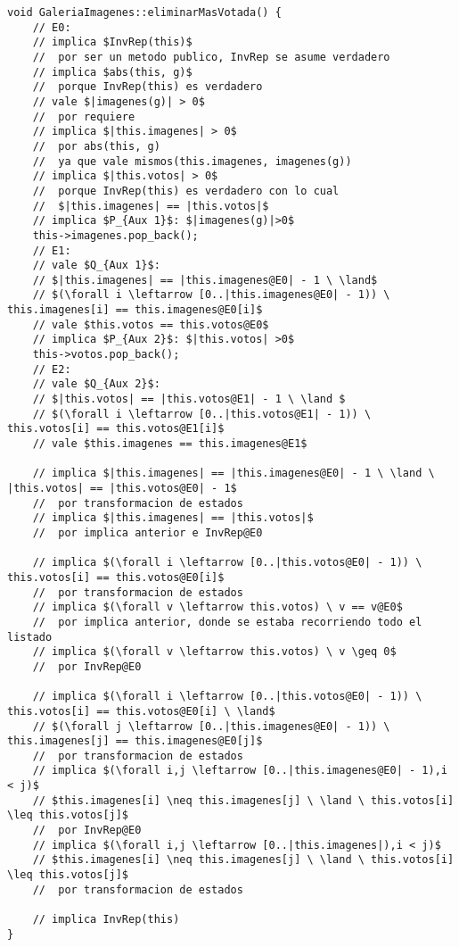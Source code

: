 \documentclass[10pt,a4paper,spanish]{article}
\begin{document}
\begin{lstlisting}
void GaleriaImagenes::eliminarMasVotada() {
	// E0:
	// implica $InvRep(this)$
	// 	por ser un metodo publico, InvRep se asume verdadero
	// implica $abs(this, g)$
	// 	porque InvRep(this) es verdadero
	// vale $|imagenes(g)| > 0$
	// 	por requiere
	// implica $|this.imagenes| > 0$
	// 	por abs(this, g)
	//	ya que vale mismos(this.imagenes, imagenes(g))
	// implica $|this.votos| > 0$
	// 	porque InvRep(this) es verdadero con lo cual
	//	$|this.imagenes| == |this.votos|$
	// implica $P_{Aux 1}$: $|imagenes(g)|>0$
	this->imagenes.pop_back();
	// E1:
	// vale $Q_{Aux 1}$: 
	// $|this.imagenes| == |this.imagenes@E0| - 1 \ \land$
	// $(\forall i \leftarrow [0..|this.imagenes@E0| - 1)) \ this.imagenes[i] == this.imagenes@E0[i]$
	// vale $this.votos == this.votos@E0$
	// implica $P_{Aux 2}$: $|this.votos| >0$
	this->votos.pop_back();
	// E2:
	// vale $Q_{Aux 2}$: 
	// $|this.votos| == |this.votos@E1| - 1 \ \land $ 
	// $(\forall i \leftarrow [0..|this.votos@E1| - 1)) \ this.votos[i] == this.votos@E1[i]$
	// vale $this.imagenes == this.imagenes@E1$

	// implica $|this.imagenes| == |this.imagenes@E0| - 1 \ \land \ |this.votos| == |this.votos@E0| - 1$
	// 	por transformacion de estados
	// implica $|this.imagenes| == |this.votos|$
	//	por implica anterior e InvRep@E0

	// implica $(\forall i \leftarrow [0..|this.votos@E0| - 1)) \ this.votos[i] == this.votos@E0[i]$
	//	por transformacion de estados
	// implica $(\forall v \leftarrow this.votos) \ v == v@E0$
	//	por implica anterior, donde se estaba recorriendo todo el listado
	// implica $(\forall v \leftarrow this.votos) \ v \geq 0$
	//	por InvRep@E0

	// implica $(\forall i \leftarrow [0..|this.votos@E0| - 1)) \ this.votos[i] == this.votos@E0[i] \ \land$
	// $(\forall j \leftarrow [0..|this.imagenes@E0| - 1)) \ this.imagenes[j] == this.imagenes@E0[j]$
	// 	por transformacion de estados
	// implica $(\forall i,j \leftarrow [0..|this.imagenes@E0| - 1),i < j)$
	// $this.imagenes[i] \neq this.imagenes[j] \ \land \ this.votos[i] \leq this.votos[j]$
	//	por InvRep@E0
	// implica $(\forall i,j \leftarrow [0..|this.imagenes|),i < j)$
	// $this.imagenes[i] \neq this.imagenes[j] \ \land \ this.votos[i] \leq this.votos[j]$
	//	por transformacion de estados

	// implica InvRep(this)
}

\end{lstlisting}
\end{document}
